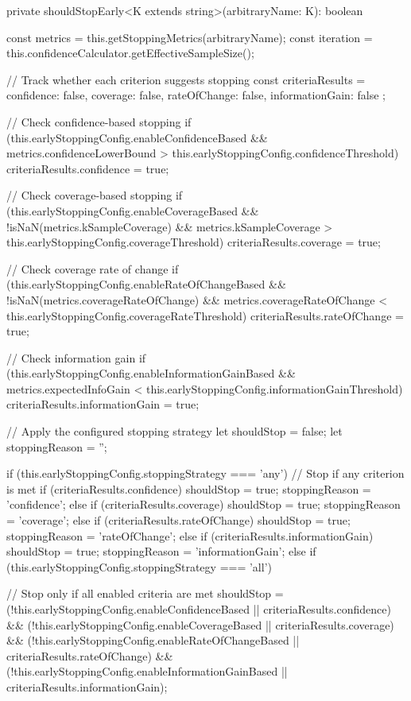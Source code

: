 \documentclass[conference]{IEEEtran}
\begin{document}
\begin{wrappedcode}
    private shouldStopEarly<K extends string>(arbitraryName: K): boolean {
      const metrics = this.getStoppingMetrics(arbitraryName);
      const iteration = this.confidenceCalculator.getEffectiveSampleSize();
      
      // Track whether each criterion suggests stopping
      const criteriaResults = {
        confidence: false,
        coverage: false,
        rateOfChange: false,
        informationGain: false
      };
      
      // Check confidence-based stopping
      if (this.earlyStoppingConfig.enableConfidenceBased \&\&
          metrics.confidenceLowerBound > this.earlyStoppingConfig.confidenceThreshold) {
        criteriaResults.confidence = true;
      }
      
      // Check coverage-based stopping
      if (this.earlyStoppingConfig.enableCoverageBased \&\&
          !isNaN(metrics.kSampleCoverage) \&\&
          metrics.kSampleCoverage > this.earlyStoppingConfig.coverageThreshold) {
        criteriaResults.coverage = true;
      }
      
      // Check coverage rate of change
      if (this.earlyStoppingConfig.enableRateOfChangeBased && 
          !isNaN(metrics.coverageRateOfChange) && 
          metrics.coverageRateOfChange < this.earlyStoppingConfig.coverageRateThreshold) {
        criteriaResults.rateOfChange = true;
      }
      
      // Check information gain
      if (this.earlyStoppingConfig.enableInformationGainBased && 
          metrics.expectedInfoGain < this.earlyStoppingConfig.informationGainThreshold) {
        criteriaResults.informationGain = true;
      }

      // Apply the configured stopping strategy
      let shouldStop = false;
      let stoppingReason = '';
      
      if (this.earlyStoppingConfig.stoppingStrategy === 'any') {
        // Stop if any criterion is met
        if (criteriaResults.confidence) {
          shouldStop = true;
          stoppingReason = 'confidence';
        } else if (criteriaResults.coverage) {
          shouldStop = true;
          stoppingReason = 'coverage';
        } else if (criteriaResults.rateOfChange) {
          shouldStop = true;
          stoppingReason = 'rateOfChange';
        } else if (criteriaResults.informationGain) {
          shouldStop = true;
          stoppingReason = 'informationGain';
        }
      } else if (this.earlyStoppingConfig.stoppingStrategy === 'all') {
        // Stop only if all enabled criteria are met
        shouldStop = 
          (!this.earlyStoppingConfig.enableConfidenceBased || criteriaResults.confidence) &&
          (!this.earlyStoppingConfig.enableCoverageBased || criteriaResults.coverage) &&
          (!this.earlyStoppingConfig.enableRateOfChangeBased || criteriaResults.rateOfChange) &&
          (!this.earlyStoppingConfig.enableInformationGainBased || criteriaResults.informationGain);
        
}}
\end{wrappedcode}
\end{document}
